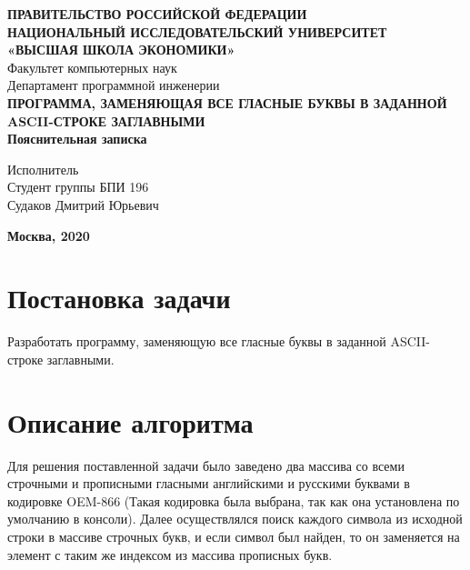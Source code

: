 \documentclass[14pt,a4paper]{article}
\begin{document}
    \begin{titlepage}
        \newpage
         \begin{center}
             {\bfseries \large ПРАВИТЕЛЬСТВО РОССИЙСКОЙ ФЕДЕРАЦИИ\\
             НАЦИОНАЛЬНЫЙ ИССЛЕДОВАТЕЛЬСКИЙ УНИВЕРСИТЕТ\\
             «ВЫСШАЯ ШКОЛА ЭКОНОМИКИ»}\\
             \vspace{1cm}
             {Факультет компьютерных наук\\
             Департамент программной инженерии}\\
             \vspace{6cm}
             {\bfseries \Large  ПРОГРАММА, ЗАМЕНЯЮЩАЯ ВСЕ ГЛАСНЫЕ БУКВЫ В ЗАДАННОЙ ASCII-СТРОКЕ
             ЗАГЛАВНЫМИ}\\
             \vspace{1cm}
             {\bfseries Пояснительная записка}
             \vspace{3cm}
         \end{center}

         \begin{flushright}
             Исполнитель\\
             Студент группы БПИ 196\\
             Судаков Дмитрий Юрьевич
         \end{flushright}
         \vfill
         \begin{center}
             {\bfseries Москва, 2020}
         \end{center}
    \end{titlepage}


    \newpage
    \tableofcontents


    \newpage
    \section{Постановка задачи}
    \par{
        Разработать программу, заменяющую все гласные буквы в заданной ASCII-строке заглавными. 
    }\\
    
    \newpage
    \section{Описание алгоритма}
    \par{
        Для решения поставленной задачи было заведено два массива со всеми строчными и прописными гласными английскими и русскими буквами в кодировке OEM-866 (Такая кодировка была выбрана, так как она установлена по умолчанию в консоли). Далее осуществлялся поиск каждого символа из исходной строки в массиве строчных букв, и если символ был найден, то он заменяется на элемент с таким же индексом из массива прописных букв.
    }
\end{document}
